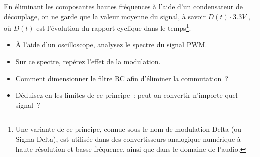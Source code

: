 \documentclass[11pt,a4paper]{article}
\theoremstyle{definition}%
\begin{document}
En éliminant les composantes hautes fréquences à l'aide d'un condensateur de découplage, on ne garde que la valeur moyenne du signal, à savoir $D(t) \cdot 3.3V$ , où $D(t)$ est l’évolution du rapport cyclique dans le temps\footnote{Une variante de ce principe, connue sous le nom de modulation Delta (ou Sigma Delta), est utilisée dans des convertisseurs analogique-numérique à haute résolution et basse fréquence, ainsi que dans le domaine de l’audio.}.

\begin{itemize}
	\item À l’aide d’un oscilloscope, analysez le spectre du signal PWM.
	\item Sur ce spectre, repérez l’effet de la modulation.
	\item Comment dimensionner le filtre RC afin d’éliminer la commutation~?
	\item Déduisez-en les limites de ce principe~: peut-on convertir n’importe quel signal~?
\end{itemize}
\end{document}
